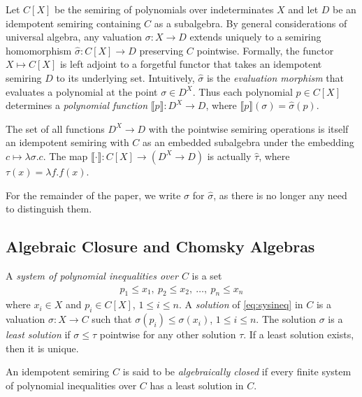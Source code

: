 \documentclass[copyright,creativecommons]{eptcs}
\theoremstyle{remark}
\newcommand\fun{\mathrel\rightarrow}
\newcommand\sem[1]{\llbracket{#1}\rrbracket}
\begin{document}
Let $C[X]$ be the semiring of polynomials over indeterminates $X$ and let $D$ be an idempotent semiring containing $C$ as a subalgebra.
By general considerations of universal algebra, any valuation $\sigma:X\fun D$ extends uniquely to a semiring homomorphism $\hat\sigma:C[X]\fun D$ preserving $C$ pointwise.
Formally, the functor $X\mapsto C[X]$ is left adjoint to a forgetful functor that takes an idempotent semiring $D$ to its underlying set.
Intuitively, $\hat\sigma$ is the \emph{evaluation morphism} that evaluates a polynomial at the point $\sigma\in D^X$.
Thus each polynomial $p\in C[X]$ determines a \emph{polynomial function} $\sem p:D^X\fun D$, where $\sem p(\sigma)=\hat\sigma(p)$.

The set of all functions $D^X\fun D$ with the pointwise semiring operations is itself an idempotent semiring with $C$ as an embedded subalgebra under the embedding $c\mapsto\lambda\sigma.c$. The map $\sem\cdot:C[X]\fun (D^X\fun D)$ is actually $\hat\tau$, where  $\tau(x) = \lambda f.f(x)$.

For the remainder of the paper, we write $\sigma$ for $\hat\sigma$, as there is no longer any need to distinguish them.

\subsection{Algebraic Closure and Chomsky Algebras}
\label{sec:Chomsky}

A \emph{system of polynomial inequalities over $C$} is a set
\begin{align}
p_1\leq x_1,\ p_2\leq x_2,\ \ldots,\ p_n\leq x_n\label{eq:sysineq}
\end{align}
where $x_i\in X$ and $p_i\in C[X]$, $1\leq i\leq n$. A \emph{solution} of \eqref{eq:sysineq} in $C$ is a valuation $\sigma:X\fun C$ such that $\sigma(p_i)\leq \sigma(x_i)$, $1\leq i\leq n$. The solution $\sigma$ is a \emph{least solution} if $\sigma\leq\tau$ pointwise for any other solution $\tau$. If a least solution exists, then it is unique.

An idempotent semiring $C$ is said to be \emph{algebraically closed} if every finite system of polynomial inequalities over $C$ has a least solution in $C$.
\end{document}
